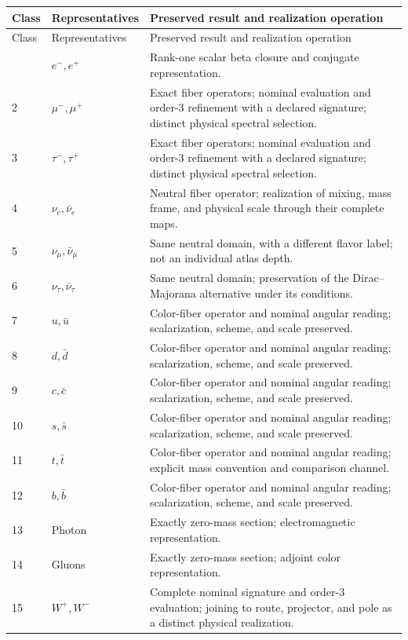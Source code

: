 \begin{longtable}{@{}p{.11\linewidth}p{.20\linewidth}p{.62\linewidth}@{}}
 \toprule
 Class&Representatives&Preserved result and realization operation\\
 \midrule\endfirsthead
 \toprule Class&Representatives&Preserved result and realization operation\\
 \midrule\endhead
 \bottomrule\endfoot
 1&\(e^-,e^+\)&Rank-one scalar beta closure and conjugate representation.\\
 2&\(\mu^-,\mu^+\)&Exact fiber operators; nominal evaluation and order-\(3\) refinement with a declared signature; distinct physical spectral selection.\\
 3&\(\tau^-,\tau^+\)&Exact fiber operators; nominal evaluation and order-\(3\) refinement with a declared signature; distinct physical spectral selection.\\
 4&\(\nu_e,\bar\nu_e\)&Neutral fiber operator; realization of mixing, mass frame, and physical scale through their complete maps.\\
 5&\(\nu_\mu,\bar\nu_\mu\)&Same neutral domain, with a different flavor label; not an individual atlas depth.\\
 6&\(\nu_\tau,\bar\nu_\tau\)&Same neutral domain; preservation of the Dirac--Majorana alternative under its conditions.\\
 7&\(u,\bar u\)&Color-fiber operator and nominal angular reading; scalarization, scheme, and scale preserved.\\
 8&\(d,\bar d\)&Color-fiber operator and nominal angular reading; scalarization, scheme, and scale preserved.\\
 9&\(c,\bar c\)&Color-fiber operator and nominal angular reading; scalarization, scheme, and scale preserved.\\
 10&\(s,\bar s\)&Color-fiber operator and nominal angular reading; scalarization, scheme, and scale preserved.\\
 11&\(t,\bar t\)&Color-fiber operator and nominal angular reading; explicit mass convention and comparison channel.\\
 12&\(b,\bar b\)&Color-fiber operator and nominal angular reading; scalarization, scheme, and scale preserved.\\
 13&Photon&Exactly zero-mass section; electromagnetic representation.\\
 14&Gluons&Exactly zero-mass section; adjoint color representation.\\
 15&\(W^+,W^-\)&Complete nominal signature and order-\(3\) evaluation; joining to route, projector, and pole as a distinct physical realization.\\

\end{longtable}
